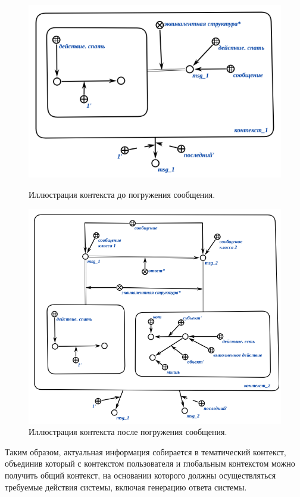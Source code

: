 \begin{figure}[H]
    \centering
    \caption{Иллюстрация контекста до погружения сообщения.}
    \includegraphics[scale=0.8]{images/part4/chapter_nl_interfaces/context_1}
    \label{fig:context_before_update}
\end{figure}

\begin{figure}[h]
    \centering
    \includegraphics[scale=0.8]{images/part4/chapter_nl_interfaces/context_2}
    \caption{Иллюстрация контекста после погружения сообщения.}
    \label{fig:updated_context}
\end{figure}

Таким образом, актуальная информация собирается в тематический контекст, объединив который с контекстом пользователя и глобальным контекстом можно получить общий контекст, на основании которого должны осуществляться требуемые действия системы, включая генерацию ответа системы.

